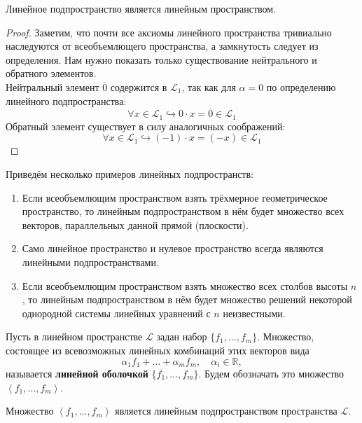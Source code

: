 \documentclass[11pt]{article}
\begin{document}
\begin{lemma}
    Линейное подпространство является линейным пространством.
\end{lemma}

\begin{proof}
    Заметим, что почти все аксиомы линейного пространства тривиально наследуются от всеобъемлющего пространства, а замкнутость 
    следует из определения. Нам нужно показать только существование нейтрального и обратного элементов.
    \\
    Нейтральный элемент $\overline{0}$ содержится в $\mathcal{L}_1$, так как для $\alpha = 0$ по определению линейного подпространства:
    \[\forall x \in \mathcal{L}_1 \hookrightarrow 0 \cdot x = \overline{0} \in \mathcal{L}_1\]
    Обратный элемент существует в силу аналогичных соображений:
    \[\forall x \in \mathcal{L}_1 \hookrightarrow (-1) \cdot x = (-x) \in \mathcal{L}_1\]
\end{proof}

\begin{remark}
    Приведём несколько примеров линейных подпространств:
    \begin{enumerate}
        \item Если всеобъемлющим пространством взять трёхмерное геометрическое пространство, то линейным подпространством в нём будет множество всех векторов, параллельных данной прямой (плоскости).
        \item Само линейное пространство и нулевое пространство всегда являются линейными подпространствами.
        \item Если всеобъемлющим пространством взять множество всех столбов высоты $n$, то линейным подпространством в нём будет множество решений некоторой однородной системы линейных уравнений с $n$ неизвестными.
    \end{enumerate}
\end{remark}

\begin{definition}
    Пусть в линейном пространстве $\mathcal{L}$ задан набор $\{f_1, \ldots, f_m\}$. Множество, состоящее из всевозможных линейных комбинаций этих векторов вида
    \[\alpha_1 f_1 + \ldots + \alpha_m f_m, \quad \alpha_i \in \mathbb{R},\]
    называется \textbf{линейной оболочкой} $\{f_1, \ldots, f_m\}$. Будем обозначать это множество $\left\langle f_1, \ldots, f_m \right\rangle$.
\end{definition}

\begin{remark}
    Множество $\left\langle f_1, \ldots, f_m \right\rangle$ является линейным подпространством пространства $\mathcal{L}$.
\end{remark}
\end{document}
